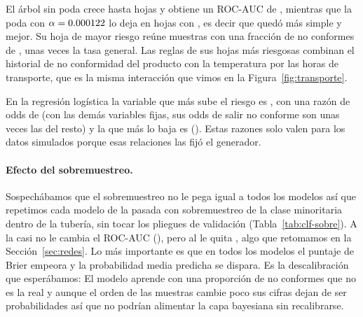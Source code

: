 \begin{table}[!htbp]
\centering
{}
\caption{Pasada didáctica de clasificación con la media y la desviación entre
bloques temporales: La habilidad es $2\,\mathrm{AUC}-1$ y la regresión
logística tiene el mayor ROC-AUC medio.}
\label{tab:clf-didactica}
\end{table}

El árbol sin poda crece hasta \ClfHojasSinPoda{} hojas y obtiene un ROC-AUC de
\ClfAUCSinPoda{}, mientras que la poda con $\alpha=0.000122$ lo deja en
\ClfHojasPodado{} hojas con \ClfAUCPodado{}, es decir que quedó más simple y
mejor. Su hoja de mayor riesgo reúne \ClfHojaRiesgoFilas{} muestras con una
fracción de no conformes de \ClfHojaRiesgoFraccion{}, unas
\ClfHojaRiesgoVeces{} veces la tasa general. Las reglas de sus hojas más
riesgosas combinan el historial de no conformidad del producto con la
temperatura por las horas de transporte, que es la misma interacción que vimos
en la Figura~\ref{fig:transporte}.

En la regresión logística la variable que más sube el riesgo es
\codigo{\ClfVariableSube}, con una razón de odds de \ClfOddsSube{} (con las
demás variables fijas, sus odds de salir no conforme son unas
\ClfOddsSube{} veces las del resto) y la que más lo baja es
\codigo{\ClfVariableBaja} (\ClfOddsBaja{}). Estas razones solo valen para los
datos simulados porque esas relaciones las fijó el generador.

\paragraph{Efecto del sobremuestreo.} Sospechábamos que el sobremuestreo no le
pega igual a todos los modelos así que repetimos cada modelo de la pasada
con sobremuestreo de la clase minoritaria dentro de la tubería, sin tocar los
pliegues de validación (Tabla~\ref{tab:clf-sobre}). A la
\MakeLowercase{\ClfSobreMenosPierde} casi no le cambia el ROC-AUC
(\ClfSobreDeltaAUCMenor{}), pero al \MakeLowercase{\ClfSobreMasPierde} le
quita \ClfSobreDeltaAUC{}, algo que retomamos en la
Sección~\ref{sec:redes}. Lo más importante es que en todos los modelos el
puntaje de Brier empeora y la probabilidad media predicha se dispara. Es la
descalibración que esperábamos: El modelo aprende con una proporción de no
conformes que no es la real y aunque el orden de las muestras cambie poco sus
cifras dejan de ser probabilidades así que no podrían alimentar la capa
bayesiana sin recalibrarse.

